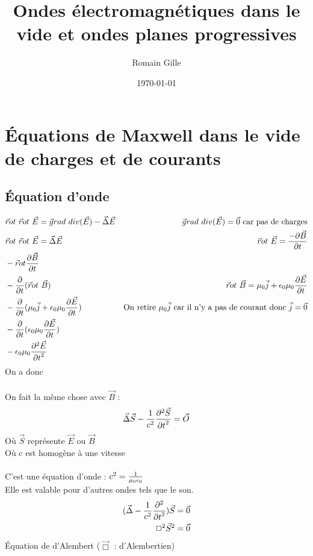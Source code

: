 \documentclass[11pt,a4paper,french]{article}
\title{Ondes électromagnétiques dans le vide et ondes planes progressives}
\author{Romain Gille}
\date{\today}
\begin{document}
\maketitle
\newpage
\section{Équations de Maxwell dans le vide de charges et de courants}
\subsection{Équation d'onde}
\begin{align*}
&\vec rot ~\vec rot ~\vec E = \vec grad ~div (\vec E) - \vec \Delta \vec E 
& \vec grad ~div(\vec E) = \vec 0 ~\text{car pas de charges}\\
& \vec rot ~\vec rot ~\vec E = \vec \Delta \vec E  
&\vec rot ~\vec E =  {- \partial \vec B \over \partial t} \\
& - \vec rot {\partial \vec B \over \partial t} \\
& - {\partial \over \partial t}(\vec rot ~\vec B)
& \vec rot ~\vec B = \mu_0 \vec j + \epsilon_0 \mu_0 {\partial \vec E \over \partial t} \\
& - {\partial \over \partial t} (\mu_0 \vec j + \epsilon_0 \mu_0 {\partial \vec E \over \partial t})
& \text{On retire}~\mu_0 \vec j ~\text{car il n'y a pas de courant donc}~\vec j = \vec 0 \\
&  - {\partial \over \partial t} (\epsilon_0 \mu_0 {\partial \vec E \over \partial t}) \\
& - \epsilon_0\mu_0 {\partial^2 \vec E \over {\partial t}^2}
\end{align*}
On a donc 
\paragraph{}
On fait la même chose avec $\vec B$ : 
$$\vec \Delta \vec S - {1 \over c^2} {\partial^2 \vec S \over {\partial t}^2} = \vec O$$
Où $\vec S$ représente $\vec E$ ou $\vec B$ \\
Où c est homogène à une vitesse \\ \\
C'est une équation d'onde : $c^2 = {1 \over \mu_0 \epsilon_0}$ \\
Elle est valable pour d'autres ondes tels que le son.
\begin{align*}
(\vec \Delta - {1 \over c^2}{\partial^2 \over {\partial t}^2})\vec S &= \vec 0 \\
\Box^2 \vec S^2 &= \vec 0
\end{align*}
Équation de  d'Alembert ($\vec \Box$ : d'Alembertien)
\clearpage
\end{document}
